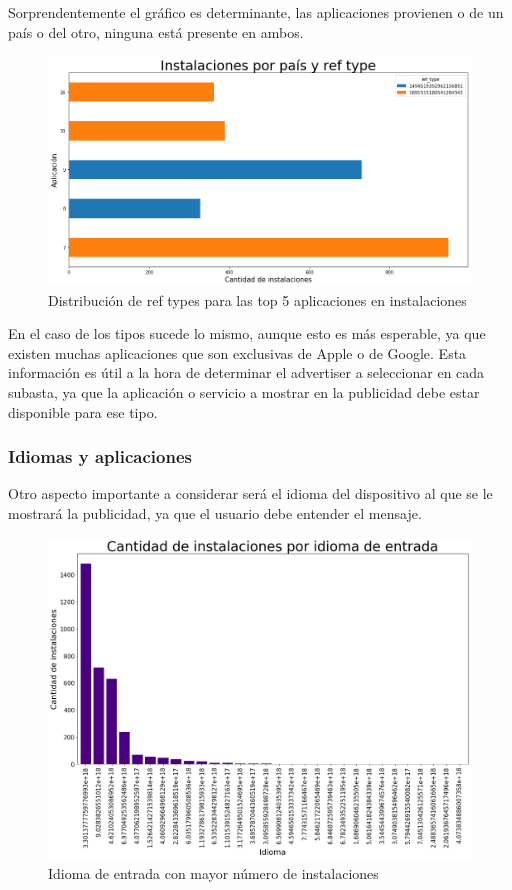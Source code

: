 \documentclass[a4paper, 12pt]{article}
\begin{document}
		Sorprendentemente el gráfico es determinante, las aplicaciones provienen o de un país o del otro, ninguna está presente en ambos.

		\FloatBarrier
		\begin{figure}[h]
			\centering
			\includegraphics[width=\textwidth]{images/installs/paisref.png}
			\caption{Distribución de ref types para las top 5 aplicaciones en instalaciones}
		\end{figure}
		\FloatBarrier

		En el caso de los tipos sucede lo mismo, aunque esto es más esperable, ya que existen muchas aplicaciones que son exclusivas de Apple o de Google. Esta información es útil a la hora de determinar el advertiser a seleccionar en cada subasta, ya que la aplicación o servicio a mostrar en la publicidad debe estar disponible para ese tipo.

	\subsubsection{Idiomas y aplicaciones}
		Otro aspecto importante a considerar será el idioma del dispositivo al que se le mostrará la publicidad, ya que el usuario debe entender el mensaje.

		\FloatBarrier
		\begin{figure}[h]
			\centering
			\includegraphics[width=\textwidth]{images/installs/idiomas.png}
			\caption{Idioma de entrada con mayor número de instalaciones}
		\end{figure}
		\FloatBarrier
\end{document}
